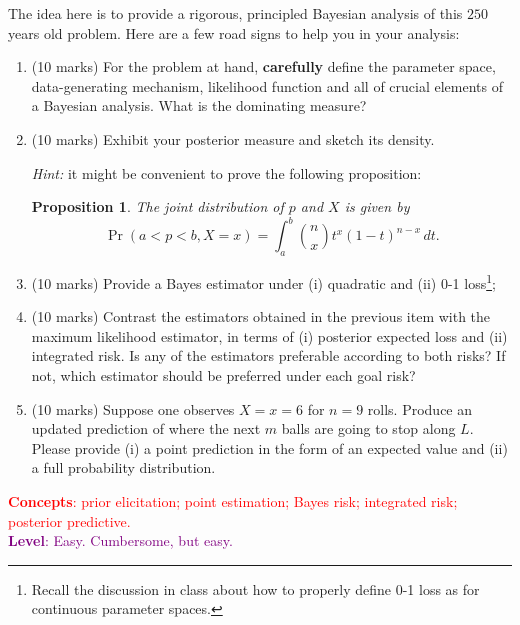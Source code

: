 \documentclass[a4paper,10pt, notitlepage]{report}
\newtheorem{proposition}[thm]{Proposition}
\newcommand{\pr}{\operatorname{Pr}} %
\begin{document}
The idea here is to provide a rigorous, principled Bayesian analysis of this $250$ years old problem.
Here are a few road signs to help you in your analysis:
\begin{enumerate}[label=\alph*)]
 \item (10 marks) For the problem at hand, \textbf{carefully} define the parameter space, data-generating mechanism, likelihood function and all of crucial elements of a Bayesian analysis. What is the dominating measure?
 \item (10 marks) Exhibit your posterior measure and sketch its density.
 
 \textit{Hint:} it might be convenient to prove the following proposition:
 \begin{proposition}
 \label{prop:joint_bayes}
 The joint distribution of $p$ and $X$ is given by
 \begin{equation*}
  \pr(a < p < b, X = x) = \int_{a}^{b} \binom{n}{x} t^x(1-t)^{n-x}\,dt.
 \end{equation*}
 \end{proposition}
 \item (10 marks) Provide a Bayes estimator under (i) quadratic and (ii) 0-1 loss\footnote{Recall the discussion in class about how to properly define 0-1 loss as for continuous parameter spaces.};
 \item (10 marks) Contrast the estimators obtained in the previous item  with the maximum likelihood estimator, in terms of (i) posterior expected loss and (ii) integrated risk.
 Is any of the estimators preferable according to both risks?
 If not, which estimator should be preferred under each goal risk?
 \item (10 marks) Suppose one observes $X = x = 6$ for $n=9$ rolls.
 Produce an updated prediction of where the next $m$ balls are going to stop along $L$.
 Please provide (i) a point prediction in the form of an expected value and (ii) a full probability distribution.
\end{enumerate}
\textcolor{red}{\textbf{Concepts}: prior elicitation; point estimation; Bayes risk; integrated risk; posterior predictive.}\\ \textcolor{purple}{\textbf{Level}: Easy.  Cumbersome, but easy.}\\
\end{document}
